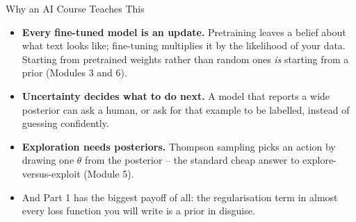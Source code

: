 \begin{frame}{Why an AI Course Teaches This}
\begin{itemize}
  \item \textbf{Every fine-tuned model is an update.} Pretraining leaves a belief about what text looks like; fine-tuning multiplies it by the likelihood of your data. Starting from pretrained weights rather than random ones \emph{is} starting from a prior (Modules 3 and 6).
  \pause
  \item \textbf{Uncertainty decides what to do next.} A model that reports a wide posterior can ask a human, or ask for that example to be labelled, instead of guessing confidently.
  \pause
  \item \textbf{Exploration needs posteriors.} Thompson sampling picks an action by drawing one $\theta$ from the posterior -- the standard cheap answer to explore-versus-exploit (Module 5).
  \pause
  \item And Part 1 has the biggest payoff of all: the regularisation term in almost every loss function you will write is a prior in disguise.
\end{itemize}
\end{frame}
